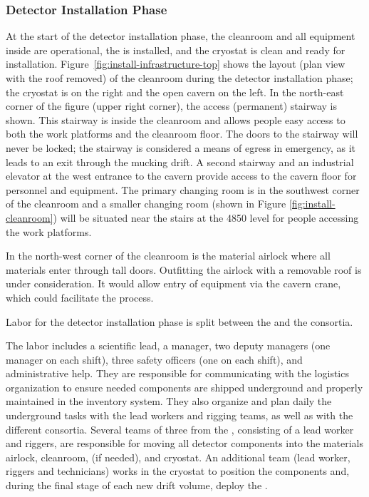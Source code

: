 \subsubsection{Detector Installation Phase}
\label{sec:fdsp-tc-inst-execute}



At the start of the detector installation phase, the cleanroom and all equipment inside are operational, the  is installed, and the cryostat is clean and ready for installation. 
Figure~\ref{fig:install-infrastructure-top} shows the layout (plan view with the roof removed) of the cleanroom during the detector installation phase; the cryostat is on the right and the open cavern on the left. 
In the north-east corner of the figure (upper right corner), the access  (permanent) stairway is shown. 
This stairway is inside the cleanroom and allows people easy access to both the work platforms and the cleanroom floor. 
The doors to the stairway will never be locked; the stairway is considered a means of egress in emergency, as it leads to an exit through the mucking drift.
A second stairway and an industrial elevator at the west entrance to the cavern provide access to the cavern floor for personnel and equipment. 
The primary changing room is in the southwest corner of the cleanroom and a smaller changing room (shown in Figure \ref{fig:install-cleanroom}) will be situated near the stairs at the 4850 level for people accessing the work platforms.

In the north-west corner of the cleanroom is the material airlock where all materials enter  through tall doors. 
Outfitting the airlock with a removable roof is under consideration. 
It would allow entry of equipment via the cavern crane, which could facilitate the process.
 
Labor for the detector installation phase is split between the  and the  consortia. 

The  labor includes a scientific lead, a manager, two deputy managers (one manager on each shift), three safety officers (one on each shift), and administrative help. They are responsible for communicating with the logistics organization to ensure needed components are shipped underground and properly maintained in the inventory system.  
They also organize and plan daily the underground tasks with the lead workers and rigging teams, as well as with the different consortia.  
Several teams of three  from the , consisting of a lead worker and riggers, are responsible for moving all detector components into the materials airlock,  cleanroom, \coldbox (if needed), and cryostat. 
An additional team (lead worker, riggers and technicians) works in the cryostat to position the  components and, during the final stage of each new drift volume,  deploy the . 

